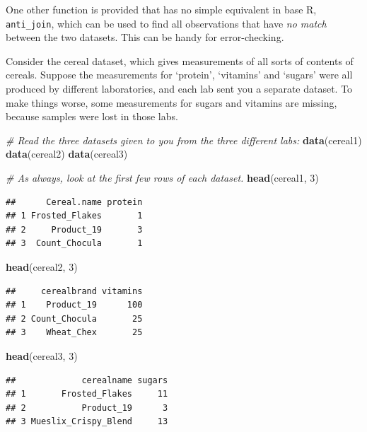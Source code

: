 \documentclass[]{book}
\newenvironment{Shaded}{\begin{snugshade}}{\end{snugshade}}
\newcommand{\CommentTok}[1]{\textcolor[rgb]{0.56,0.35,0.01}{\textit{#1}}}
\newcommand{\DecValTok}[1]{\textcolor[rgb]{0.00,0.00,0.81}{#1}}
\newcommand{\KeywordTok}[1]{\textcolor[rgb]{0.13,0.29,0.53}{\textbf{#1}}}
\newcommand{\NormalTok}[1]{#1}
\begin{document}
One other function is provided that has no simple equivalent in base R, \texttt{anti\_join}, which can be used to find all observations that have \emph{no match} between the two datasets. This can be handy for error-checking.

Consider the cereal dataset, which gives measurements of all sorts of contents of cereals. Suppose the measurements for `protein', `vitamins' and `sugars' were all produced by different laboratories, and each lab sent you a separate dataset. To make things worse, some measurements for sugars and vitamins are missing, because samples were lost in those labs.

\begin{Shaded}
\begin{Highlighting}[]
\CommentTok{# Read the three datasets given to you from the three different labs:}
\KeywordTok{data}\NormalTok{(cereal1)}
\KeywordTok{data}\NormalTok{(cereal2)}
\KeywordTok{data}\NormalTok{(cereal3)}

\CommentTok{# As always, look at the first few rows of each dataset.}
\KeywordTok{head}\NormalTok{(cereal1, }\DecValTok{3}\NormalTok{)}
\end{Highlighting}
\end{Shaded}

\begin{verbatim}
##      Cereal.name protein
## 1 Frosted_Flakes       1
## 2     Product_19       3
## 3  Count_Chocula       1
\end{verbatim}

\begin{Shaded}
\begin{Highlighting}[]
\KeywordTok{head}\NormalTok{(cereal2, }\DecValTok{3}\NormalTok{)}
\end{Highlighting}
\end{Shaded}

\begin{verbatim}
##     cerealbrand vitamins
## 1    Product_19      100
## 2 Count_Chocula       25
## 3    Wheat_Chex       25
\end{verbatim}

\begin{Shaded}
\begin{Highlighting}[]
\KeywordTok{head}\NormalTok{(cereal3, }\DecValTok{3}\NormalTok{)}
\end{Highlighting}
\end{Shaded}

\begin{verbatim}
##             cerealname sugars
## 1       Frosted_Flakes     11
## 2           Product_19      3
## 3 Mueslix_Crispy_Blend     13
\end{verbatim}
\end{document}
